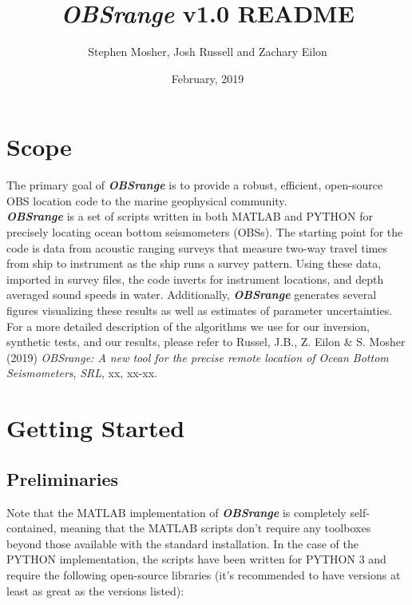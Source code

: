 \documentclass[titlepage, 12pt]{article}
\begin{document}
 \title{\textbf{\textit{\textit{\textbf{OBSrange}}}} v1.0 README}
 \author{Stephen Mosher, Josh Russell and Zachary Eilon}
 \date{February, 2019}
 \maketitle{}

 \tableofcontents
 \newpage

 \section{Scope}
   The primary goal of \textit{\textbf{OBSrange}} is to provide a robust, efficient, open-source OBS location code to the marine geophysical community.\\ 

   \textit{\textbf{OBSrange}} is a set of scripts written in both MATLAB and PYTHON for precisely locating ocean bottom seismometers (OBSs). The starting point for the code is data from acoustic ranging surveys that measure two-way travel times from ship to instrument as the ship runs a survey pattern. Using these data, imported in survey files, the code inverts for instrument locations, and depth averaged sound speeds in water. Additionally, \textit{\textbf{OBSrange}} generates several figures visualizing these results as well as estimates of parameter uncertainties. For a more detailed description of the algorithms we use for our inversion, synthetic tests, and our results, please refer to Russel, J.B., Z. Eilon \& S. Mosher (2019) \textit{OBSrange: A new tool for the precise remote location of Ocean Bottom Seismometers}, \textit{SRL}, xx, xx-xx.

 \section{Getting Started}
  
  \subsection{Preliminaries}
  Note that the MATLAB implementation of \textit{\textbf{OBSrange}} is completely self-contained, meaning that the MATLAB scripts don’t require any toolboxes beyond those available with the standard installation. In the case of the PYTHON implementation, the scripts have been written for PYTHON 3 and require the following open-source libraries (it’s recommended to have versions at least as great as the versions listed):
\end{document}
